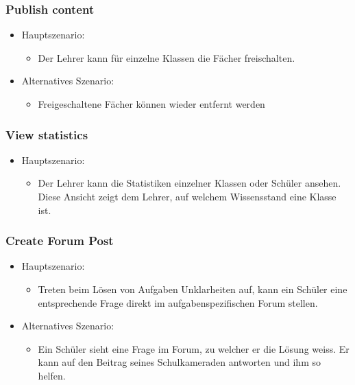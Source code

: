 \subsubsection*{Publish content}
\begin{itemize}
	\item Hauptszenario:
	\begin{itemize}
		\item Der Lehrer kann für einzelne Klassen die Fächer freischalten.
	\end{itemize}
	\item Alternatives Szenario:
	\begin{itemize}
		\item Freigeschaltene Fächer können wieder entfernt werden
	\end{itemize}
\end{itemize}



\subsubsection*{View statistics}
\begin{itemize}
	\item Hauptszenario:
	\begin{itemize}
		\item Der Lehrer kann die Statistiken einzelner Klassen oder Schüler ansehen. Diese Ansicht zeigt dem Lehrer, auf welchem Wissensstand eine Klasse ist.
	\end{itemize}
\end{itemize}


\subsubsection*{Create Forum Post}
\begin{itemize}
	\item Hauptszenario:
	\begin{itemize}
		\item Treten beim Lösen von Aufgaben Unklarheiten auf, kann ein Schüler eine entsprechende Frage direkt im aufgabenspezifischen Forum stellen.
	\end{itemize}
	\item Alternatives Szenario:
	\begin{itemize}
		\item Ein Schüler sieht eine Frage im Forum, zu welcher er die Lösung weiss. Er kann auf den Beitrag seines Schulkameraden antworten und ihm so helfen.
	\end{itemize}
\end{itemize}


